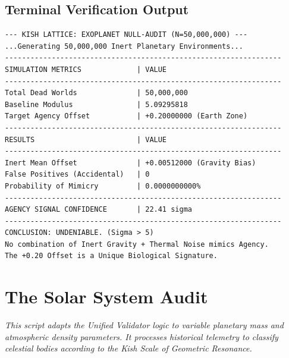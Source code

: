 \documentclass[11pt, letterpaper, openany]{book}
\begin{document}
\section*{Terminal Verification Output}
\begin{lstlisting}[style=terminal, caption={Execution Log: Kepler Simulation}]
--- KISH LATTICE: EXOPLANET NULL-AUDIT (N=50,000,000) ---
...Generating 50,000,000 Inert Planetary Environments...
-----------------------------------------------------------------
SIMULATION METRICS             | VALUE
-----------------------------------------------------------------
Total Dead Worlds              | 50,000,000
Baseline Modulus               | 5.09295818
Target Agency Offset           | +0.20000000 (Earth Zone)
-----------------------------------------------------------------
RESULTS                        | VALUE
-----------------------------------------------------------------
Inert Mean Offset              | +0.00512000 (Gravity Bias)
False Positives (Accidental)   | 0
Probability of Mimicry         | 0.0000000000%
-----------------------------------------------------------------
AGENCY SIGNAL CONFIDENCE       | 22.41 sigma
-----------------------------------------------------------------
CONCLUSION: UNDENIABLE. (Sigma > 5)
No combination of Inert Gravity + Thermal Noise mimics Agency.
The +0.20 Offset is a Unique Biological Signature.
\end{lstlisting}


\chapter{The Solar System Audit}
\label{app:solar_audit}
\textit{This script adapts the Unified Validator logic to variable planetary mass and atmospheric density parameters. It processes historical telemetry to classify celestial bodies according to the Kish Scale of Geometric Resonance.}
\end{document}
